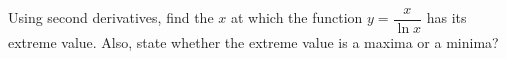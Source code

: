 
%
%
%
%
% 
% 

\question Using second derivatives, find the $x$ at which the function 
$y = \dfrac{x}{\ln x}$ has its extreme value. Also, state whether the extreme 
value is a maxima or a minima? 

\insertQR{}

\ifprintanswers
\fi 


